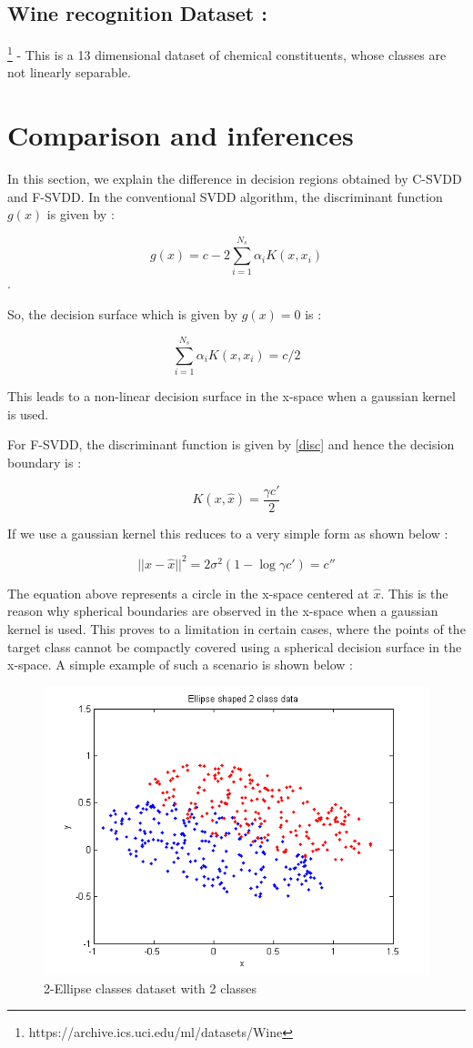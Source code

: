 \documentclass{article} %
\begin{document}
\subsection{Wine recognition Dataset :}\footnote{https://archive.ics.uci.edu/ml/datasets/Wine}  - This is a 13 dimensional dataset of chemical constituents, whose classes are not linearly separable. 


\section{Comparison and inferences}
In this section, we explain the difference in decision regions obtained by C-SVDD and F-SVDD. In the conventional SVDD algorithm, the discriminant function $g(x)$ is given by :

\[ g(x) = c - 2 \sum\limits_{i=1}^{N_s}\alpha_i K(x,x_i) \].

So, the decision surface which is given by $g(x) = 0$ is   :

\[  \sum\limits_{i=1}^{N_s}\alpha_i K(x,x_i)  = c/2 \]

This leads to a non-linear decision surface in the x-space when a gaussian kernel is used.

For F-SVDD, the discriminant function is given by \ref{disc} and hence the decision boundary is :

\[ K(x,\hat{x}) = \frac{\gamma c'}{2}\]

If we use a gaussian kernel this reduces to a very simple form as shown below :

\[ || x - \hat{x}||^2 = 2 \sigma^2 (1 - \log{\gamma c'}) = c''\] 

The equation above represents a circle in the x-space centered at $\hat{x}$. This is the reason why spherical boundaries are observed in the x-space when a gaussian kernel is used. This proves to a limitation in certain cases, where the points of the target class cannot be compactly covered using a spherical decision surface in the x-space. A simple example of such a scenario is shown below :


\begin{figure}
  \centering
  \includegraphics[width=\linewidth]{../Code/Ellipse/svdd/data}
  \caption{2-Ellipse classes dataset with 2 classes}
\end{figure}
\end{document}
